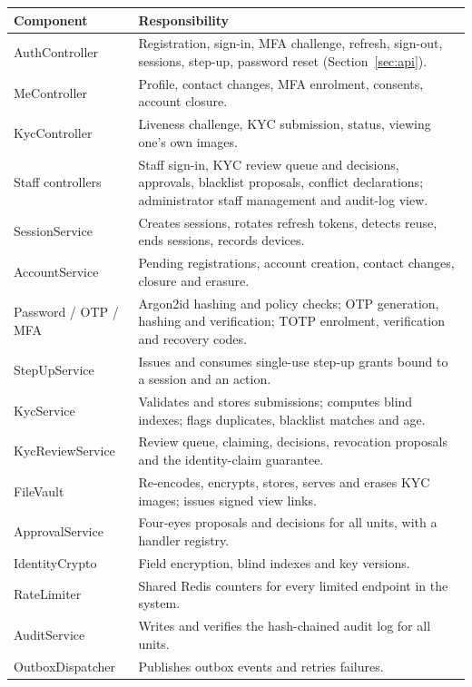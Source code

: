 \documentclass[11pt,a4paper]{article}
\newenvironment{dtable}[1]{\small\begin{longtable}{#1}}{\end{longtable}}
\begin{document}
\begin{dtable}{@{}>{\raggedright\arraybackslash}p{3.2cm}>{\raggedright\arraybackslash}p{12cm}@{}}
\toprule
\textbf{Component} & \textbf{Responsibility} \\ \midrule \endhead
AuthController & Registration, sign-in, MFA challenge, refresh, sign-out, sessions, step-up, password reset (Section~\ref{sec:api}). \\
MeController & Profile, contact changes, MFA enrolment, consents, account closure. \\
KycController & Liveness challenge, KYC submission, status, viewing one's own images. \\
Staff controllers & Staff sign-in, KYC review queue and decisions, approvals, blacklist proposals, conflict declarations; administrator staff management and audit-log view. \\
SessionService & Creates sessions, rotates refresh tokens, detects reuse, ends sessions, records devices. \\
AccountService & Pending registrations, account creation, contact changes, closure and erasure. \\
Password / OTP / MFA & Argon2id hashing and policy checks; OTP generation, hashing and verification; TOTP enrolment, verification and recovery codes. \\
StepUpService & Issues and consumes single-use step-up grants bound to a session and an action. \\
KycService & Validates and stores submissions; computes blind indexes; flags duplicates, blacklist matches and age. \\
KycReviewService & Review queue, claiming, decisions, revocation proposals and the identity-claim guarantee. \\
FileVault & Re-encodes, encrypts, stores, serves and erases KYC images; issues signed view links. \\
ApprovalService & Four-eyes proposals and decisions for all units, with a handler registry. \\
IdentityCrypto & Field encryption, blind indexes and key versions. \\
RateLimiter & Shared Redis counters for every limited endpoint in the system. \\
AuditService & Writes and verifies the hash-chained audit log for all units. \\
OutboxDispatcher & Publishes outbox events and retries failures. \\
\bottomrule
\end{dtable}
\end{document}

